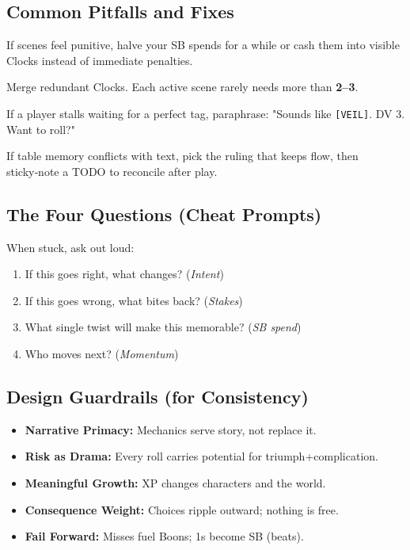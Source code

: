 \subsection{Common Pitfalls and Fixes}
\begin{description}[leftmargin=1.5em, style=nextline]
  \item[Over‑cranking SB:] If scenes feel punitive, halve your SB spends for a while or cash them into visible Clocks instead of immediate penalties.
  \item[Clock Sprawl:] Merge redundant Clocks. Each active scene rarely needs more than \textbf{2--3}.
  \item[Tag Paralysis:] If a player stalls waiting for a perfect tag, paraphrase: "Sounds like \texttt{[VEIL]}. DV 3. Want to roll?"
  \item[Rules Drift:] If table memory conflicts with text, pick the ruling that keeps flow, then sticky‑note a TODO to reconcile after play.
\end{description}

\subsection{The Four Questions (Cheat Prompts)}
When stuck, ask out loud:
\begin{enumerate}
  \item If this goes right, what changes? (\emph{Intent})
  \item If this goes wrong, what bites back? (\emph{Stakes})
  \item What single twist will make this memorable? (\emph{SB spend})
  \item Who moves next? (\emph{Momentum})
\end{enumerate}

\subsection{Design Guardrails (for Consistency)}
\begin{itemize}
  \item \textbf{Narrative Primacy:} Mechanics serve story, not replace it.
  \item \textbf{Risk as Drama:} Every roll carries potential for triumph+complication.
  \item \textbf{Meaningful Growth:} XP changes characters and the world.
  \item \textbf{Consequence Weight:} Choices ripple outward; nothing is free.
  \item \textbf{Fail Forward:} Misses fuel Boons; 1s become SB (beats).
\end{itemize}

